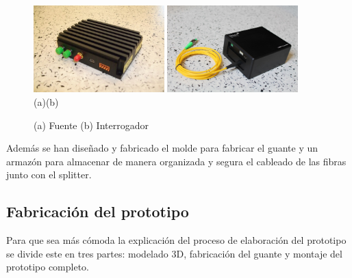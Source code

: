 \begin{itemize}
\begin{figure}[H]
	\centering
	\includegraphics[width=0.45\textwidth]{./img/fuente}
	\includegraphics[width=0.45\textwidth]{./img/interrogador} 
	\\(a)\hspace{7cm}(b)
	\caption{(a) Fuente \cite{fuente} (b) Interrogador \cite{interrogador}} 
	\label{fig:FuenteInterrogador}
\end{figure}


 
\end{itemize}

Además se han diseñado y fabricado el molde para fabricar el guante y  un armazón para almacenar de manera organizada y segura el cableado de las fibras junto con el splitter.




\subsection{Fabricación del prototipo}
\label{sec:proceso3}
 
 
Para que sea más cómoda la explicación del proceso de elaboración del prototipo se divide este en tres partes: modelado 3D, fabricación del guante y montaje del prototipo completo.

